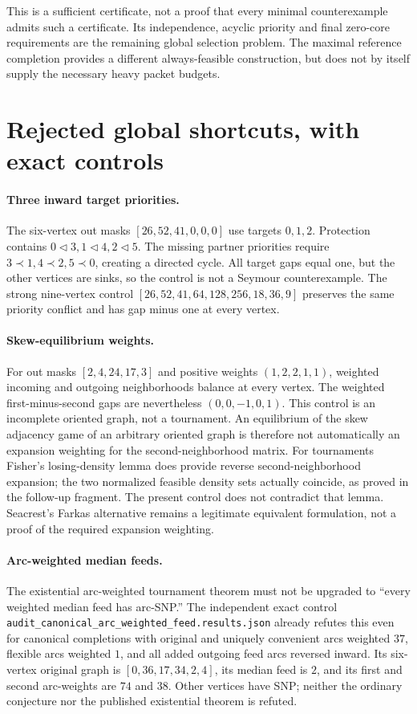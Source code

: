 This is a sufficient certificate, not a proof that every minimal
counterexample admits such a certificate. Its independence, acyclic
priority and final zero-core requirements are the remaining global
selection problem. The maximal reference completion provides a different
always-feasible construction, but does not by itself supply the necessary
heavy packet budgets.

\section{Rejected global shortcuts, with exact controls}
\label{sec:global-shortcut-controls}

\paragraph{Three inward target priorities.}
The six-vertex out masks $[26,52,41,0,0,0]$ use targets $0,1,2$.
Protection contains $0\triangleleft3,1\triangleleft4,2\triangleleft5$.
The missing partner priorities require $3\prec1,4\prec2,5\prec0$,
creating a directed cycle. All target gaps equal one, but the other
vertices are sinks, so the control is not a Seymour counterexample.
The strong nine-vertex control $[26,52,41,64,128,256,18,36,9]$ preserves
the same priority conflict and has gap minus one at every vertex.

\paragraph{Skew-equilibrium weights.}
For out masks $[2,4,24,17,3]$ and positive weights $(1,2,2,1,1)$,
weighted incoming and outgoing neighborhoods balance at every vertex.
The weighted first-minus-second gaps are nevertheless $(0,0,-1,0,1)$.
This control is an incomplete oriented graph, not a tournament.
An equilibrium of the skew adjacency game of an arbitrary oriented
graph is therefore not automatically an expansion weighting for the
second-neighborhood matrix. For tournaments Fisher's losing-density
lemma does provide reverse second-neighborhood expansion; the two
normalized feasible density sets actually coincide, as proved in the
follow-up fragment. The present control does not contradict that lemma.
Seacrest's Farkas alternative remains a legitimate equivalent formulation,
not a proof of the required expansion weighting.

\paragraph{Arc-weighted median feeds.}
The existential arc-weighted tournament theorem must not be upgraded to
``every weighted median feed has arc-SNP.'' The independent exact control
\texttt{audit\_canonical\_arc\_weighted\_feed.results.json} already
refutes this even for canonical completions with original and uniquely
convenient arcs weighted $37$, flexible arcs weighted $1$, and all added
outgoing feed arcs reversed inward. Its six-vertex original graph is
$[0,36,17,34,2,4]$, its median feed is $2$, and its first and second
arc-weights are $74$ and $38$. Other vertices have SNP; neither the
ordinary conjecture nor the published existential theorem is refuted.

